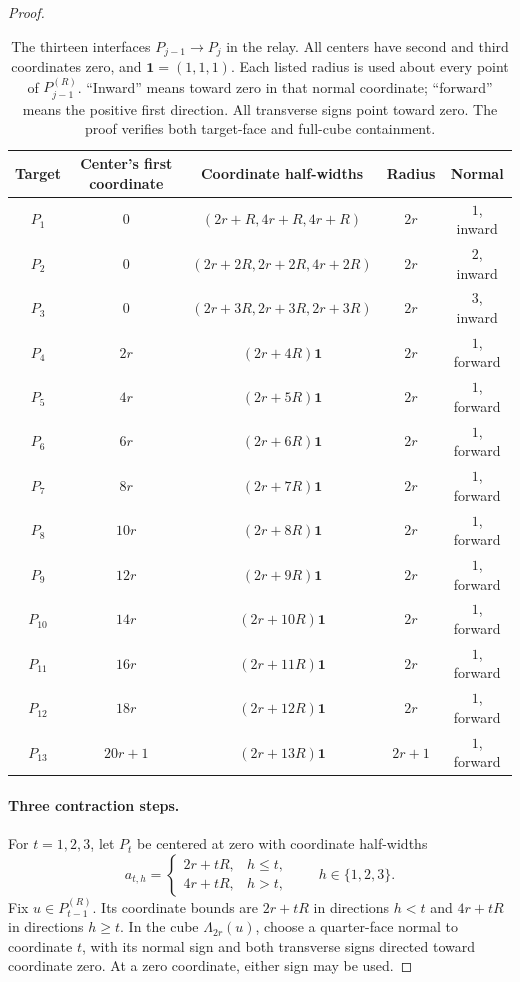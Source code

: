 \begin{proof}
\begin{table}[tbp]
\centering
\small
\begin{tabular}{c c c c c}
\hline
Target & Center's first coordinate & Coordinate half-widths & Radius & Normal\\
\hline
$P_1$ & $0$ & $(2r+R,4r+R,4r+R)$ & $2r$ & $1$, inward\\
$P_2$ & $0$ & $(2r+2R,2r+2R,4r+2R)$ & $2r$ & $2$, inward\\
$P_3$ & $0$ & $(2r+3R,2r+3R,2r+3R)$ & $2r$ & $3$, inward\\
$P_4$ & $2r$ & $(2r+4R)\mathbf1$ & $2r$ & $1$, forward\\
$P_5$ & $4r$ & $(2r+5R)\mathbf1$ & $2r$ & $1$, forward\\
$P_6$ & $6r$ & $(2r+6R)\mathbf1$ & $2r$ & $1$, forward\\
$P_7$ & $8r$ & $(2r+7R)\mathbf1$ & $2r$ & $1$, forward\\
$P_8$ & $10r$ & $(2r+8R)\mathbf1$ & $2r$ & $1$, forward\\
$P_9$ & $12r$ & $(2r+9R)\mathbf1$ & $2r$ & $1$, forward\\
$P_{10}$ & $14r$ & $(2r+10R)\mathbf1$ & $2r$ & $1$, forward\\
$P_{11}$ & $16r$ & $(2r+11R)\mathbf1$ & $2r$ & $1$, forward\\
$P_{12}$ & $18r$ & $(2r+12R)\mathbf1$ & $2r$ & $1$, forward\\
$P_{13}$ & $20r+1$ & $(2r+13R)\mathbf1$ & $2r+1$ & $1$, forward\\
\hline
\end{tabular}
\caption{The thirteen interfaces $P_{j-1}\to P_j$ in the relay.
All centers have second and third coordinates zero, and
$\mathbf1=(1,1,1)$. Each listed radius is used about every point
of $P_{j-1}^{(R)}$. ``Inward'' means toward zero in that normal coordinate;
``forward'' means the positive first direction. All transverse signs point
toward zero. The proof verifies both target-face and full-cube containment.}
\label{geom:interfaces}
\end{table}

\paragraph{Three contraction steps.}
For $t=1,2,3$, let $P_t$ be centered at zero with coordinate half-widths
\begin{equation}\label{geom:contraction-widths}
  a_{t,h}=\begin{cases}
    2r+tR,&h\le t,\\
    4r+tR,&h>t,
  \end{cases}
  \qquad h\in\{1,2,3\}.
\end{equation}
Fix $u\in P_{t-1}^{(R)}$. Its coordinate bounds are $2r+tR$ in directions
$h<t$ and $4r+tR$ in directions $h\ge t$. In the cube $\Lambda_{2r}(u)$,
choose a quarter-face normal to coordinate $t$, with its normal sign and both
transverse signs directed toward coordinate zero. At a zero coordinate,
either sign may be used.


\end{proof}

